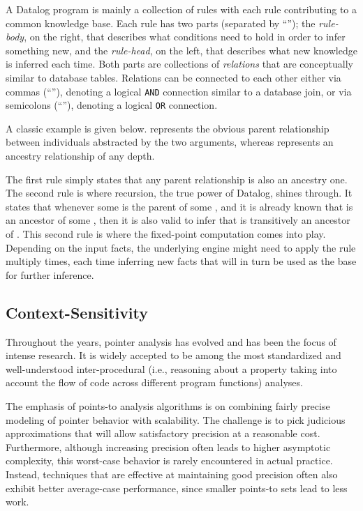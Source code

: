 A Datalog program is mainly a collection of rules with each rule contributing to a common knowledge base. Each rule has two parts (separated by ``\dl{:-}''); the \emph{rule-body}, on the right, that describes what conditions need to hold in order to infer something new, and the \emph{rule-head}, on the left, that describes what new knowledge is inferred each time. Both parts are collections of \emph{relations} that are conceptually similar to database tables. Relations can be connected to each other either via commas (``\dl{,}''), denoting a logical \texttt{AND} connection similar to a database join, or via semicolons (``\dl{;}''), denoting a logical \texttt{OR} connection.

A classic example is given below.  represents the obvious parent relationship between individuals abstracted by the two arguments, whereas  represents an ancestry relationship of any depth. 

 \dl{:-} 

 \dl{:-} \dl{,} 

The first rule simply states that any parent relationship is also an ancestry one. The second rule is where recursion, the true power of Datalog, shines through. It states that whenever some  is the parent of some , and it is already known that  is an ancestor of some , then it is also valid to infer that  is transitively an ancestor of . This second rule is where the fixed-point computation comes into play. Depending on the input facts, the underlying engine might need to apply the rule multiply times, each time inferring new facts that will in turn be used as the base for further inference.


\subsection{Context-Sensitivity}

Throughout the years, pointer analysis has evolved and has been the focus of
intense research. It is widely accepted to be among the most standardized and
well-understood inter-procedural (i.e., reasoning about a property taking into
account the flow of code across different program functions) analyses.

The emphasis of points-to analysis algorithms is on combining fairly precise modeling of pointer behavior with scalability. The challenge is to pick judicious approximations that will allow satisfactory precision at a reasonable cost. Furthermore, although increasing precision often leads to higher asymptotic complexity, this worst-case behavior is rarely encountered in actual practice. Instead, techniques that are effective at maintaining good precision often also exhibit better average-case performance, since smaller points-to sets lead to less work.

